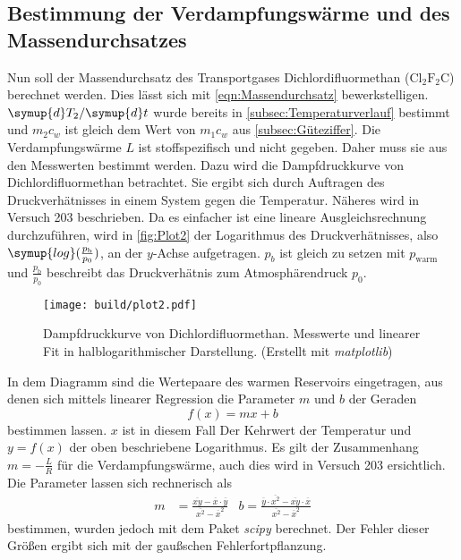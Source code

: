 \subsection{Bestimmung der Verdampfungswärme und des Massendurchsatzes}
\label{subsec:Massendurchsatz}
Nun soll der Massendurchsatz des Transportgases Dichlordifluormethan ($\text{Cl}_2\text{F}_2\text{C}$) berechnet werden. Dies lässt sich mit \autoref{eqn:Massendurchsatz} bewerkstelligen. 
$\symup{d}T_2/\symup{d}t$ wurde bereits in \autoref{subsec:Temperaturverlauf} bestimmt und $m_2 c_w$ ist gleich dem Wert von $m_1 c_w$ aus \autoref{subsec:Güteziffer}.
Die Verdampfungswärme $L$ ist stoffspezifisch und nicht gegeben. Daher muss sie aus den Messwerten bestimmt werden. Dazu wird die Dampfdruckkurve von Dichlordifluormethan
betrachtet. Sie ergibt sich durch Auftragen des Druckverhätnisses in einem System gegen die Temperatur. Näheres wird in Versuch 203 \cite{v203} beschrieben. 
Da es einfacher ist eine lineare Ausgleichsrechnung durchzuführen, wird in \autoref{fig:Plot2} der Logarithmus des Druckverhätnisses, also
$\symup{log}(\frac{p_{\text{b}}}{p_0})$, an der $y$-Achse aufgetragen. $p_b$ ist gleich zu setzen mit $p_\text{warm}$ und $\frac{p_{\text{b}}}{p_0}$ beschreibt das Druckverhätnis
zum Atmosphärendruck $p_0$.

\begin{figure}
  \centering
  \caption{Dampfdruckkurve von Dichlordifluormethan. Messwerte und linearer Fit in halblogarithmischer Darstellung. (Erstellt mit \textit{matplotlib}\cite{matplotlib})}
  \label{fig:Plot2}
  \texttt{[image: build/plot2.pdf]}
\end{figure}

In dem Diagramm sind die Wertepaare des warmen Reservoirs eingetragen, aus denen sich mittels linearer Regression die Parameter $m$ und $b$ der Geraden
\begin{equation*}
  f(x) = mx + b
\end{equation*}
bestimmen lassen. $x$ ist in diesem Fall Der Kehrwert der Temperatur und $y = f(x)$ der oben beschriebene Logarithmus. Es gilt der Zusammenhang $m = - \frac{L}{R}$ für 
die Verdampfungswärme, auch dies wird in Versuch 203 \cite{v203} ersichtlich. Die Parameter lassen sich rechnerisch als
\begin{align*}
  m &= \frac{\overline{xy}-\overline{x} \cdot \overline{y}}{\overline{x^2}-\overline{x}^2} & %
  b = \frac{\overline{y} \cdot \overline{x^2}-\overline{xy} \cdot \overline{x}}{\overline{x^2}-\overline{x}^2}
\end{align*}
bestimmen, wurden jedoch mit dem Paket \textit{scipy} \cite{scipy} berechnet. Der Fehler dieser Größen ergibt sich mit der gaußschen Fehlerfortpflanzung.

